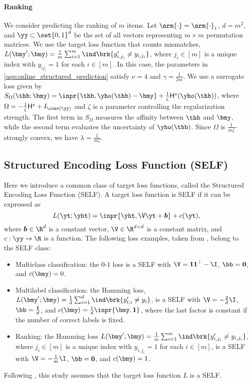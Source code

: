\paragraph{Ranking}
We consider predicting the ranking of $m$ items. 
Let $\nrm{\cdot} = \nrm{\cdot}_1$, $d=m^2$, and $\yy\subset\set{0,1}^d$ be the set of all vectors representing $m \times m$ permutation matrices.  
We use the target loss function that counts mismatches, $L(\bmy^{\prime};\bmy)=\frac{1}{m}\sum_{i=1}^{m}\ind\brk{y_{i,j_i}^{\prime}\neq y_{i,j_i}}$, where $j_i\in[m]$ is a unique index with $y_{ij_i}=1$ for each $i\in[m]$.  
In this case, the parameters in \cref{asp:online_structured_prediction} satisfy $\nu=4$ and $\gamma=\frac{1}{2m}$.  
We use a surrogate loss given by $S_\Omega(\thb;\bmy)=\inpr{\thb,\yho(\thb)-\bmy}+\frac{1}{\zeta}\mathsf{H}^s(\yho(\thb))$, where $\Omega=-\frac{1}{\zeta}\mathsf{H}^s+I_{\conv(\yy)}$ and $\zeta$ is a parameter controlling the regularization strength. 
The first term in $S_\Omega$ measures the affinity between $\thb$ and $\bmy$, while the second term evaluates the uncertainty of $\yho(\thb)$.  
Since $\Omega$ is $\frac{1}{m\zeta}$-strongly convex, we have $\lambda=\frac{1}{m\zeta}$.


\subsection{Structured Encoding Loss Function (SELF)}\label{subsec:self}
Here we introduce a common class of target loss functions, called the Structured Encoding Loss Function (SELF).
A target loss function is SELF if it can be expressed as  
\begin{equation}\label{eq:self}
    L(\yt; \yht)=\inpr{\yht,\V\yt+\bm{b}}+c(\yt),
\end{equation}
where $\bm{b} \in \R^d$ is a constant vector, $\V\in\R^{d\times d}$ is a constant matrix, and $c:\yy\to\R$ is a function.  
The following loss examples, taken from \citet[Appendix A]{NEURIPS2019_Blondel}, belong to the SELF class: 
\begin{itemize}%
\item Multiclass classification: the 0-1 loss is a SELF with $\V=\bm{1}\bm{1}^\top-\I$, $\bb=\bm{0}$, and $c(\bmy)=0$.  

\item Multilabel classification: the Hamming loss, 
$L(\bmy^{\prime};\bmy)=\frac{1}{d}\sum_{i=1}^{d}\ind\brk{y^{\prime}_{t,i}\neq y_{i}}$, is a SELF with $\V=-\frac{2}{d}\I$, $\bb=\frac{\bm{1}}{d}$, and $c(\bmy)=\frac{1}{d}\inpr{\bmy,\bm{1}}$, where the last factor is constant if the number of correct labels is fixed.

\item Ranking: the Hamming loss  
$L(\bmy^{\prime};\bmy)=\frac{1}{m}\sum_{i=1}^{m}\ind\brk{y_{i,j_i}^{\prime}\neq y_{i,j_{i}}}$, where $j_i\in[m]$ is a unique index with $y_{i,j_i}=1$ for each $i\in[m]$, is a SELF with  
$\V=-\frac{1}{m}\I$, $\bb=\bm{0}$, and $c(\bmy)=1$.
\end{itemize}
Following \citet{pmlr-v247-sakaue24a}, this study assumes that the target loss function $L$ is a SELF.

